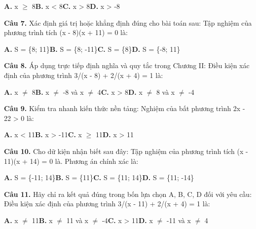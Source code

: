 \documentclass[11pt,a4paper]{article}
\begin{document}
\hspace*{1.5em}\textbf{A.} x $\ge$ 8\quad\quad \textbf{B.} x < 8\quad\quad \textbf{C.} x > 8\quad\quad \textbf{D.} x > -8\par\vspace{2pt}
\textbf{\color{primary} Câu 7.} Xác định giá trị hoặc khẳng định đúng cho bài toán sau: Tập nghiệm của phương trình tích (x - 8)(x + 11) = 0 là:\par
\hspace*{1.5em}\textbf{A.} S = \{8; 11\}\quad\quad \textbf{B.} S = \{8; -11\}\quad\quad \textbf{C.} S = \{8\}\quad\quad \textbf{D.} S = \{-8; 11\}\par\vspace{2pt}
\textbf{\color{primary} Câu 8.} Áp dụng trực tiếp định nghĩa và quy tắc trong Chương II: Điều kiện xác định của phương trình 3/(x - 8) + 2/(x + 4) = 1 là:\par
\hspace*{1.5em}\textbf{A.} x $\ne$ 8\quad\quad \textbf{B.} x $\ne$ -8 và x $\ne$ 4\quad\quad \textbf{C.} x > 8\quad\quad \textbf{D.} x $\ne$ 8 và x $\ne$ -4\par\vspace{2pt}
\textbf{\color{primary} Câu 9.} Kiểm tra nhanh kiến thức nền tảng: Nghiệm của bất phương trình 2x - 22 > 0 là:\par
\hspace*{1.5em}\textbf{A.} x < 11\quad\quad \textbf{B.} x > -11\quad\quad \textbf{C.} x $\ge$ 11\quad\quad \textbf{D.} x > 11\par\vspace{2pt}
\textbf{\color{primary} Câu 10.} Cho dữ kiện nhận biết sau đây: Tập nghiệm của phương trình tích (x - 11)(x + 14) = 0 là. Phương án chính xác là:\par
\hspace*{1.5em}\textbf{A.} S = \{-11; 14\}\quad\quad \textbf{B.} S = \{11\}\quad\quad \textbf{C.} S = \{11; 14\}\quad\quad \textbf{D.} S = \{11; -14\}\par\vspace{2pt}
\textbf{\color{primary} Câu 11.} Hãy chỉ ra kết quả đúng trong bốn lựa chọn A, B, C, D đối với yêu cầu: Điều kiện xác định của phương trình 3/(x - 11) + 2/(x + 4) = 1 là:\par
\hspace*{1.5em}\textbf{A.} x $\ne$ 11\quad\quad \textbf{B.} x $\ne$ 11 và x $\ne$ -4\quad\quad \textbf{C.} x > 11\quad\quad \textbf{D.} x $\ne$ -11 và x $\ne$ 4\par\vspace{2pt}
\end{document}

